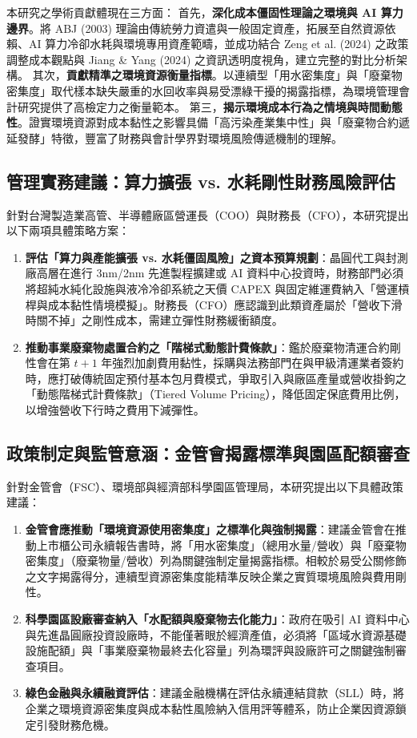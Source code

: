 \documentclass[12pt,a4paper]{article}
\begin{document}
本研究之學術貢獻體現在三方面：
首先，\textbf{深化成本僵固性理論之環境與 AI 算力邊界}。將 ABJ (2003) 理論由傳統勞力資遣與一般固定資產，拓展至自然資源依賴、AI 算力冷卻水耗與環境專用資產範疇，並成功結合 Zeng et al. (2024) 之政策調整成本觀點與 Jiang \& Yang (2024) 之資訊透明度視角，建立完整的對比分析架構。
其次，\textbf{貢獻精準之環境資源衡量指標}。以連續型「用水密集度」與「廢棄物密集度」取代樣本缺失嚴重的水回收率與易受漂綠干擾的揭露指標，為環境管理會計研究提供了高檢定力之衡量範本。
第三，\textbf{揭示環境成本行為之情境與時間動態性}。證實環境資源對成本黏性之影響具備「高污染產業集中性」與「廢棄物合約遞延發酵」特徵，豐富了財務與會計學界對環境風險傳遞機制的理解。

\subsection{管理實務建議：算力擴張 vs. 水耗剛性財務風險評估}

針對台灣製造業高管、半導體廠區營運長（COO）與財務長（CFO），本研究提出以下兩項具體策略方案：

\begin{enumerate}[leftmargin=*]
    \item \textbf{評估「算力與產能擴張 vs. 水耗僵固風險」之資本預算規劃}：晶圓代工與封測廠高層在進行 3nm/2nm 先進製程擴建或 AI 資料中心投資時，財務部門必須將超純水純化設施與液冷冷卻系統之天價 CAPEX 與固定維運費納入「營運槓桿與成本黏性情境模擬」。財務長（CFO）應認識到此類資產屬於「營收下滑時關不掉」之剛性成本，需建立彈性財務緩衝額度。
    \item \textbf{推動事業廢棄物處置合約之「階梯式動態計費條款」}：鑑於廢棄物清運合約剛性會在第 $t+1$ 年強烈加劇費用黏性，採購與法務部門在與甲級清運業者簽約時，應打破傳統固定預付基本包月費模式，爭取引入與廠區產量或營收掛鉤之「動態階梯式計費條款」（Tiered Volume Pricing），降低固定保底費用比例，以增強營收下行時之費用下減彈性。
\end{enumerate}

\subsection{政策制定與監管意涵：金管會揭露標準與園區配額審查}

針對金管會（FSC）、環境部與經濟部科學園區管理局，本研究提出以下具體政策建議：

\begin{enumerate}[leftmargin=*]
    \item \textbf{金管會應推動「環境資源使用密集度」之標準化與強制揭露}：建議金管會在推動上市櫃公司永續報告書時，將「用水密集度」（總用水量/營收）與「廢棄物密集度」（廢棄物量/營收）列為關鍵強制定量揭露指標。相較於易受公關修飾之文字揭露得分，連續型資源密集度能精準反映企業之實質環境風險與費用剛性。
    \item \textbf{科學園區設廠審查納入「水配額與廢棄物去化能力」}：政府在吸引 AI 資料中心與先進晶圓廠投資設廠時，不能僅著眼於經濟產值，必須將「區域水資源基礎設施配額」與「事業廢棄物最終去化容量」列為環評與設廠許可之關鍵強制審查項目。
    \item \textbf{綠色金融與永續融資評估}：建議金融機構在評估永續連結貸款（SLL）時，將企業之環境資源密集度與成本黏性風險納入信用評等體系，防止企業因資源鎖定引發財務危機。
\end{enumerate}
\end{document}
